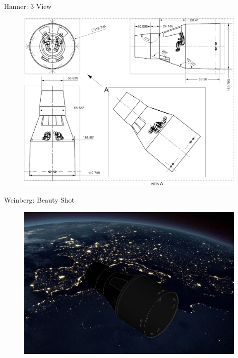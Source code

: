 \documentclass[10pt]{beamer}
\begin{document}
\begin{frame}{Hanner: 3 View}
\begin{figure}
\centering
\includegraphics[width=\textwidth]{Hanner_3_View.png}
\end{figure}
\end{frame}

	\begin{frame}{Weinberg: Beauty Shot}
\begin{figure}
	\centering
	\includegraphics[width=\textwidth]{Weinberg_Beauty.png}
\end{figure}
\end{frame}
\end{document}
